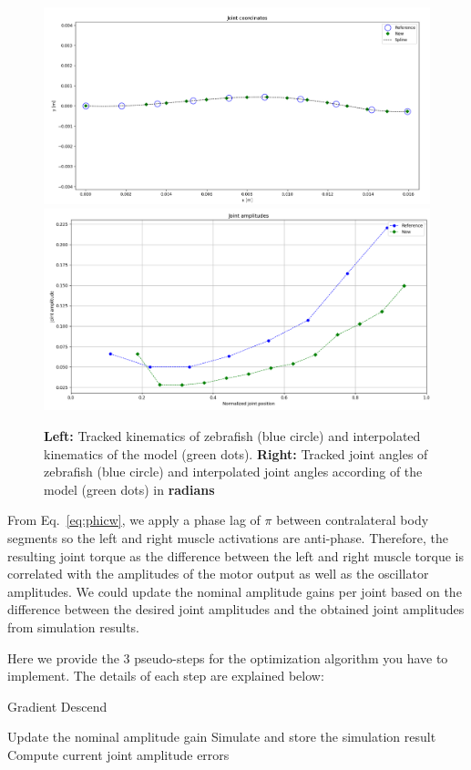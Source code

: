\documentclass{cmc}
\begin{document}
\begin{figure}[H]
  \centering
    \hspace{-0.5cm}
    \includegraphics[width=.5\textwidth]{figures/joint_fitting.png}
    \includegraphics[width=.5\textwidth]{figures/joint_kinematics_observed_fitted.png}

  \caption{
  \label{fig:zebrafish_kinematics} \textbf{Left:} Tracked kinematics of zebrafish (blue circle) and interpolated kinematics of the model (green dots). \textbf{Right:} Tracked joint angles of zebrafish (blue circle) and interpolated joint angles according of the model (green dots) in \textbf{radians}
  }

\end{figure}

From Eq.~\ref{eq:phicw}, we apply a phase lag of $\pi$ between contralateral body segments so the left and right muscle activations are anti-phase. Therefore, the resulting joint torque as the difference between the left and right muscle torque is correlated with the amplitudes of the motor output as well as the oscillator amplitudes. We could update the nominal amplitude gains per joint based on the difference between the desired joint amplitudes and the obtained joint amplitudes from simulation results.

Here we provide the 3 pseudo-steps for the optimization algorithm you have to implement. The details of each step are explained below:

\begin{algorithm}[H]
\caption{Gradient Descend}\label{euclid}
\begin{algorithmic}[1]
\State Update the nominal amplitude gain
\State Simulate and store the simulation result
\State Compute current joint amplitude errors
\EndWhile
\end{algorithmic}
\end{algorithm}
\end{document}
